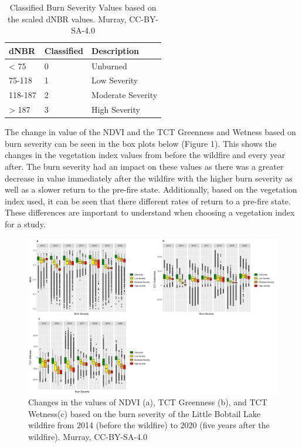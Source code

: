 \documentclass[
]{book}
\begin{document}
\begin{table}

\caption{\label{tab:13-murray-case-study-table-1}Classified Burn Severity Values based on the scaled dNBR values. Murray, CC-BY-SA-4.0}
\centering
\begin{tabular}[t]{l|l|l}
\hline
dNBR & Classified & Description\\
\hline
< 75 & 0 & Unburned\\
\hline
75-118 & 1 & Low Severity\\
\hline
118-187 & 2 & Moderate Severity\\
\hline
> 187 & 3 & High Severity\\
\hline
\end{tabular}
\end{table}

The change in value of the NDVI and the TCT Greenness and Wetness based on burn severity can be seen in the box plots below (Figure 1). This shows the changes in the vegetation index values from before the wildfire and every year after. The burn severity had an impact on these values as there was a greater decrease in value immediately after the wildfire with the higher burn severity as well as a slower return to the pre-fire state. Additionally, based on the vegetation index used, it can be seen that there different rates of return to a pre-fire state. These differences are important to understand when choosing a vegetation index for a study.

\begin{figure}
\includegraphics[width=0.75\linewidth]{images/13-VIPlots} \caption{Changes in the values of NDVI (a), TCT Greenness (b), and TCT Wetness(c) based on the burn severity of the Little Bobtail Lake wildfire from 2014 (before the wildfire) to 2020 (five years after the wildfire). Murray, CC-BY-SA-4.0}\label{fig:unnamed-chunk-35}
\end{figure}
\end{document}
